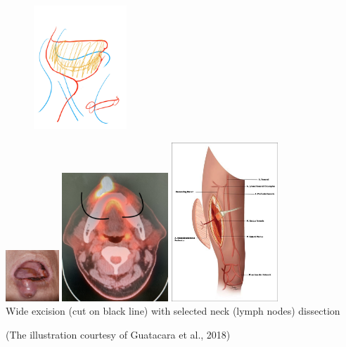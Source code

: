 \documentclass[
paper=landscape,
paper=160mm:90mm, %
fontsize=11pt, %
pagesize, %
parskip=half-, %
]{scrartcl} %
\theoremstyle{mythmstyle} %
\begin{document}
\begin{figure}
    \centering
\includegraphics[width=3.5cm]{SOHND_Artwork.jpg}
\end{figure}



\clearpage

\thispagestyle{headings}

\includegraphics[width=2cm]{IMG_7174.jpg}
\includegraphics[width=4cm]{IMG_6430.jpg} %
\includegraphics[width=4cm]{Figure-5-Vascular-anatomy-of-ALT-flap-Guatacara-et-al-2018_W640.jpg}\\
\large Wide excision (cut on black line) with selected neck (lymph nodes) dissection\\
\hspace{2cm} 
{\tiny (The illustration courtesy of Guatacara et al., 2018) \par}
\end{document}
